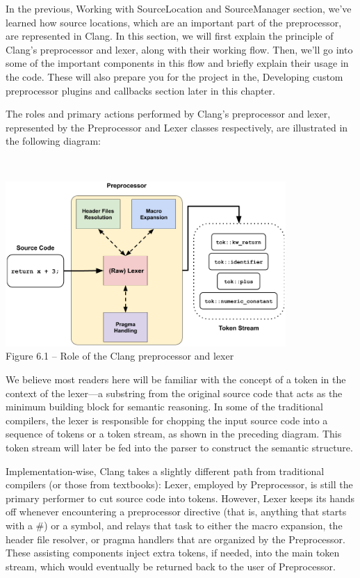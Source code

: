 
In the previous, Working with SourceLocation and SourceManager section, we've learned how source locations, which are an important part of the preprocessor, are represented in Clang. In this section, we will first explain the principle of Clang's preprocessor and lexer, along with their working flow. Then, we'll go into some of the important components in this flow and briefly explain their usage in the code. These will also prepare you for the project in the, Developing custom preprocessor plugins and callbacks section later in this chapter.


The roles and primary actions performed by Clang's preprocessor and lexer, represented by the Preprocessor and Lexer classes respectively, are illustrated in the following diagram:

\hspace*{\fill} \\ %
\begin{center}
\includegraphics[width=0.8\textwidth]{content/2/chapter6/images/1.png}\\
Figure 6.1 – Role of the Clang preprocessor and lexer
\end{center}

We believe most readers here will be familiar with the concept of a token in the context of the lexer—a substring from the original source code that acts as the minimum building block for semantic reasoning. In some of the traditional compilers, the lexer is responsible for chopping the input source code into a sequence of tokens or a token stream, as shown in the preceding diagram. This token stream will later be fed into the parser to construct the semantic structure.

Implementation-wise, Clang takes a slightly different path from traditional compilers (or those from textbooks): Lexer, employed by Preprocessor, is still the primary performer to cut source code into tokens. However, Lexer keeps its hands off whenever encountering a preprocessor directive (that is, anything that starts with a \#) or a symbol, and relays that task to either the macro expansion, the header file resolver, or pragma handlers that are organized by the Preprocessor. These assisting components inject extra tokens, if needed, into the main token stream, which would eventually be returned back to the user of Preprocessor.

